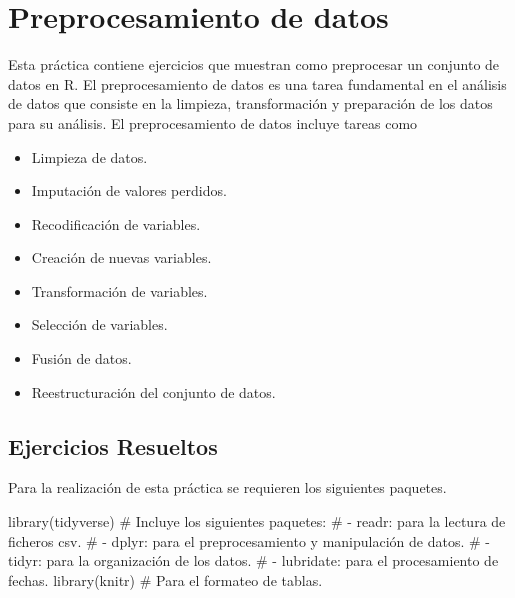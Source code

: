 \documentclass[
  a4paper,
]{scrreport}
\newenvironment{Shaded}{\begin{snugshade}}{\end{snugshade}}
\newcommand{\CommentTok}[1]{\textcolor[rgb]{0.37,0.37,0.37}{#1}}
\newcommand{\FunctionTok}[1]{\textcolor[rgb]{0.28,0.35,0.67}{#1}}
\newcommand{\NormalTok}[1]{\textcolor[rgb]{0.00,0.23,0.31}{#1}}
\providecommand{\tightlist}{%
  \setlength{\itemsep}{0pt}\setlength{\parskip}{0pt}}\usepackage{longtable,booktabs,array}
\theoremstyle{definition}
\theoremstyle{remark}
\begin{document}

\chapter{Preprocesamiento de datos}\label{preprocesamiento-de-datos}

Esta práctica contiene ejercicios que muestran como preprocesar un
conjunto de datos en R. El preprocesamiento de datos es una tarea
fundamental en el análisis de datos que consiste en la limpieza,
transformación y preparación de los datos para su análisis. El
preprocesamiento de datos incluye tareas como

\begin{itemize}
\tightlist
\item
  Limpieza de datos.
\item
  Imputación de valores perdidos.
\item
  Recodificación de variables.
\item
  Creación de nuevas variables.
\item
  Transformación de variables.
\item
  Selección de variables.
\item
  Fusión de datos.
\item
  Reestructuración del conjunto de datos.
\end{itemize}

\section{Ejercicios Resueltos}\label{ejercicios-resueltos-1}

Para la realización de esta práctica se requieren los siguientes
paquetes.

\begin{Shaded}
\begin{Highlighting}[]
\FunctionTok{library}\NormalTok{(tidyverse) }
\CommentTok{\# Incluye los siguientes paquetes:}
\CommentTok{\# {-} readr: para la lectura de ficheros csv. }
\CommentTok{\# {-} dplyr: para el preprocesamiento y manipulación de datos.}
\CommentTok{\# {-} tidyr: para la organización de los datos.}
\CommentTok{\# {-} lubridate: para el procesamiento de fechas.}
\FunctionTok{library}\NormalTok{(knitr) }\CommentTok{\# Para el formateo de tablas.}
\end{Highlighting}
\end{Shaded}
\end{document}
